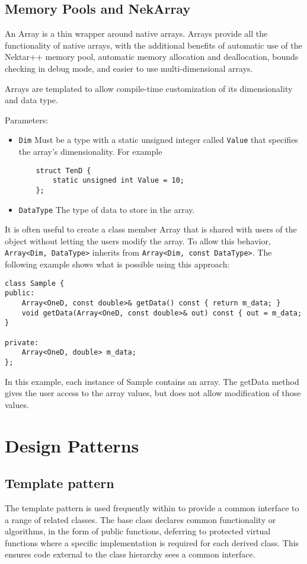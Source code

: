 \subsection{Memory Pools and NekArray}
An Array is a thin wrapper around native arrays. Arrays provide all the
functionality of native arrays, with the additional benefits of automatic use of
the Nektar++ memory pool, automatic memory allocation and deallocation, bounds
checking in debug mode, and easier to use multi-dimensional arrays.

Arrays are templated to allow compile-time customization of its dimensionality
and data type.

Parameters:
\begin{itemize}
    \item \lstinline{Dim} Must be a type with a static unsigned integer called
    \lstinline{Value} that specifies the array's dimensionality. For example
    \begin{lstlisting}
    struct TenD {
        static unsigned int Value = 10;
    };
    \end{lstlisting}
    \item \lstinline{DataType} The type of data to store in the array.
\end{itemize}

It is often useful to create a class member Array that is shared with users of
the object without letting the users modify the array. To allow this behavior,
\lstinline{Array<Dim, DataType>} inherits from 
\lstinline{Array<Dim, const DataType>}. The following
example shows what is possible using this approach:
\begin{lstlisting}
class Sample {
public:
    Array<OneD, const double>& getData() const { return m_data; }
    void getData(Array<OneD, const double>& out) const { out = m_data; }

private:
    Array<OneD, double> m_data;
};
\end{lstlisting}
In this example, each instance of Sample contains an array. The getData
method gives the user access to the array values, but does not allow
modification of those values.



\section{Design Patterns}
\subsection{Template pattern}
\label{s:template-pattern}
The template pattern is used frequently within {\nek} to provide a common interface to a range of related classes. The base class declares common functionality or algorithms, in the form of public functions, deferring to protected virtual functions where a specific implementation is required for each derived class. This ensures code external to the class hierarchy sees a common interface.

